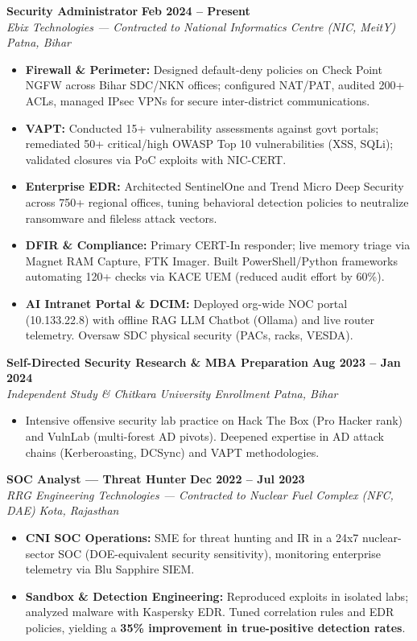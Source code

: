 \documentclass[10pt,a4paper]{article}
\newcommand{\resumeRole}[4]{
  \vspace{3pt}
  {\textbf{\small #1}} \hfill {\footnotesize\textbf{#2}} \\[-2pt]
  {\footnotesize\textit{\color{medgray}#3}} \hfill {\footnotesize\textit{\color{medgray}#4}}
  \vspace{1pt}
}
\begin{document}
\resumeRole
  {Security Administrator}{Feb 2024 -- Present}
  {Ebix Technologies --- Contracted to National Informatics Centre (NIC, MeitY)}{Patna, Bihar}
\begin{itemize}[leftmargin=0.15in, itemsep=1pt, topsep=1pt]
  \item \footnotesize\textbf{Firewall \& Perimeter:} Designed default-deny policies on Check Point NGFW across Bihar SDC/NKN offices; configured NAT/PAT, audited 200+ ACLs, managed IPsec VPNs for secure inter-district communications.
  \item \footnotesize\textbf{VAPT:} Conducted 15+ vulnerability assessments against govt portals; remediated 50+ critical/high OWASP Top 10 vulnerabilities (XSS, SQLi); validated closures via PoC exploits with NIC-CERT.
  \item \footnotesize\textbf{Enterprise EDR:} Architected SentinelOne and Trend Micro Deep Security across 750+ regional offices, tuning behavioral detection policies to neutralize ransomware and fileless attack vectors.
  \item \footnotesize\textbf{DFIR \& Compliance:} Primary CERT-In responder; live memory triage via Magnet RAM Capture, FTK Imager. Built PowerShell/Python frameworks automating 120+ checks via KACE UEM (reduced audit effort by 60\%).
  \item \footnotesize\textbf{AI Intranet Portal \& DCIM:} Deployed org-wide NOC portal (10.133.22.8) with offline RAG LLM Chatbot (Ollama) and live router telemetry. Oversaw SDC physical security (PACs, racks, VESDA).
\end{itemize}

\resumeRole
  {Self-Directed Security Research \& MBA Preparation}{Aug 2023 -- Jan 2024}
  {Independent Study \& Chitkara University Enrollment}{Patna, Bihar}
\begin{itemize}[leftmargin=0.15in, itemsep=1pt, topsep=1pt]
  \item \footnotesize Intensive offensive security lab practice on Hack The Box (Pro Hacker rank) and VulnLab (multi-forest AD pivots). Deepened expertise in AD attack chains (Kerberoasting, DCSync) and VAPT methodologies.
\end{itemize}

\resumeRole
  {SOC Analyst --- Threat Hunter}{Dec 2022 -- Jul 2023}
  {RRG Engineering Technologies --- Contracted to Nuclear Fuel Complex (NFC, DAE)}{Kota, Rajasthan}
\begin{itemize}[leftmargin=0.15in, itemsep=1pt, topsep=1pt]
  \item \footnotesize\textbf{CNI SOC Operations:} SME for threat hunting and IR in a 24x7 nuclear-sector SOC (DOE-equivalent security sensitivity), monitoring enterprise telemetry via Blu Sapphire SIEM.
  \item \footnotesize\textbf{Sandbox \& Detection Engineering:} Reproduced exploits in isolated labs; analyzed malware with Kaspersky EDR. Tuned correlation rules and EDR policies, yielding a \textbf{35\% improvement in true-positive detection rates}.
\end{itemize}
\end{document}
